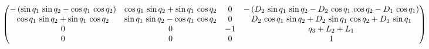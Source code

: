 $$\ifx\endpmatrix\undefined\pmatrix{\else\begin{pmatrix}\fi -\left(
 \sin q_{1}\,\sin q_{2}-\cos q_{1}\,\cos q_{2}\right)&\cos q_{1}\,
 \sin q_{2}+\sin q_{1}\,\cos q_{2}&0&-\left(D_{2}\,\sin q_{1}\,\sin 
 q_{2}-D_{2}\,\cos q_{1}\,\cos q_{2}-D_{1}\,\cos q_{1}\right)\cr 
 \cos q_{1}\,\sin q_{2}+\sin q_{1}\,\cos q_{2}&\sin q_{1}\,\sin q_{2}
 -\cos q_{1}\,\cos q_{2}&0&D_{2}\,\cos q_{1}\,\sin q_{2}+D_{2}\,\sin 
 q_{1}\,\cos q_{2}+D_{1}\,\sin q_{1}\cr 0&0&-1&q_{3}+L_{2}+L_{1}\cr 0
 &0&0&1\cr \ifx\endpmatrix\undefined}\else\end{pmatrix}\fi $$
